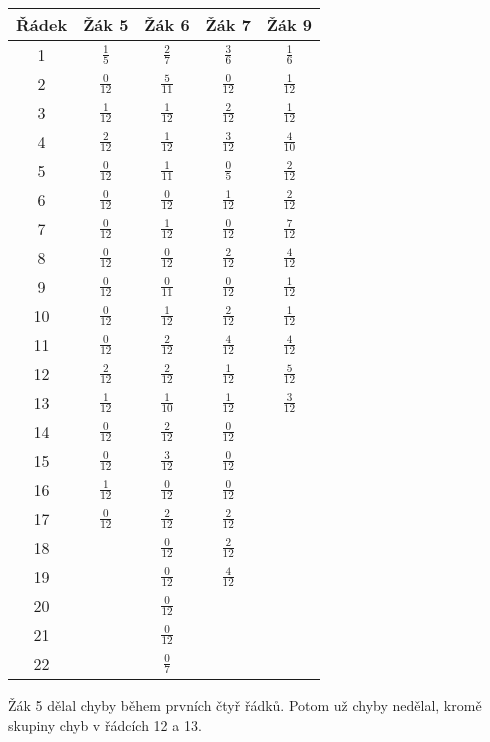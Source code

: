 \begin{tabular}[hb]{|c|c|c|c|c|}
\hline
Řádek&Žák 5&Žák 6&Žák 7&Žák 9\\
\hline
1&$\frac{1}{5}$&$\frac{2}{7}$&$\frac{3}{6}$&$\frac{1}{6}$\\
\hline
2&$\frac{0}{12}$&$\frac{5}{11}$&$\frac{0}{12}$&$\frac{1}{12}$\\
\hline
3&$\frac{1}{12}$&$\frac{1}{12}$&$\frac{2}{12}$&$\frac{1}{12}$\\
\hline
4&$\frac{2}{12}$&$\frac{1}{12}$&$\frac{3}{12}$&$\frac{4}{10}$\\
\hline
5&$\frac{0}{12}$&$\frac{1}{11}$&$\frac{0}{5}$&$\frac{2}{12}$\\
\hline
6&$\frac{0}{12}$&$\frac{0}{12}$&$\frac{1}{12}$&$\frac{2}{12}$\\
\hline
7&$\frac{0}{12}$&$\frac{1}{12}$&$\frac{0}{12}$&$\frac{7}{12}$\\
\hline
8&$\frac{0}{12}$&$\frac{0}{12}$&$\frac{2}{12}$&$\frac{4}{12}$\\
\hline
9&$\frac{0}{12}$&$\frac{0}{11}$&$\frac{0}{12}$&$\frac{1}{12}$\\
\hline
10&$\frac{0}{12}$&$\frac{1}{12}$&$\frac{2}{12}$&$\frac{1}{12}$\\
\hline
11&$\frac{0}{12}$&$\frac{2}{12}$&$\frac{4}{12}$&$\frac{4}{12}$\\
\hline
12&$\frac{2}{12}$&$\frac{2}{12}$&$\frac{1}{12}$&$\frac{5}{12}$\\
\hline
13&$\frac{1}{12}$&$\frac{1}{10}$&$\frac{1}{12}$&$\frac{3}{12}$\\
\hline
14&$\frac{0}{12}$&$\frac{2}{12}$&$\frac{0}{12}$&\\
\hline
15&$\frac{0}{12}$&$\frac{3}{12}$&$\frac{0}{12}$&\\
\hline
16&$\frac{1}{12}$&$\frac{0}{12}$&$\frac{0}{12}$&\\
\hline
17&$\frac{0}{12}$&$\frac{2}{12}$&$\frac{2}{12}$&\\
\hline
18&&$\frac{0}{12}$&$\frac{2}{12}$&\\
\hline
19&&$\frac{0}{12}$&$\frac{4}{12}$&\\
\hline
20&&$\frac{0}{12}$&&\\
\hline
21&&$\frac{0}{12}$&&\\
\hline
22&&$\frac{0}{7}$&&\\
\hline
\end{tabular}

Žák 5 dělal chyby během prvních čtyř řádků.  Potom už chyby nedělal, kromě skupiny chyb v řádcích 12 a 13.

